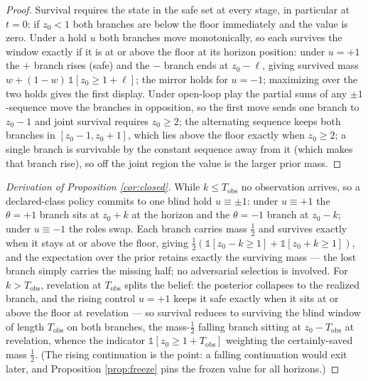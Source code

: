 \documentclass[10pt,twocolumn]{article}
\theoremstyle{plain}
\theoremstyle{definition}
\theoremstyle{remark}
\begin{document}
\begin{proof}
Survival requires the state in the safe set at every stage, in particular
at \(t = 0\): if \(z_{0} < 1\) both branches are below the floor
immediately and the value is zero. Under a hold \(u\) both branches
move monotonically, so each survives the window exactly if it is at or
above the floor at its horizon position: under \(u = +1\) the
\(+\) branch rises (safe) and the \(-\) branch ends at
\(z_{0} - \ell\), giving survived mass
\(w + (1 - w)\,\mathbb{1}[z_{0} \ge 1 + \ell]\); the mirror holds
for \(u = -1\); maximizing over the two holds gives the first display.
Under open-loop play the partial sums of any \(\pm1\)-sequence move the
branches in opposition, so the first move sends one branch to
\(z_{0} - 1\) and joint survival requires \(z_{0} \ge 2\); the
alternating sequence keeps both branches in
\([z_{0} - 1, z_{0} + 1]\), which lies above the floor exactly when
\(z_{0} \ge 2\); a single branch is survivable by the constant
sequence away from it (which makes that branch rise), so off the joint
region the value is the larger prior mass.
\end{proof}

\begin{proof}[Derivation of Proposition \ref{cor:closed}]
While \(k \le T_{\mathrm{obs}}\) no observation arrives, so a
declared-class policy commits to one blind hold \(u \equiv \pm1\): under \(u \equiv +1\) the
\(\theta = +1\) branch sits at \(z_{0} + k\) at the horizon and the
\(\theta = -1\) branch at \(z_{0} - k\); under \(u \equiv -1\) the roles
swap. Each branch carries mass \(\tfrac{1}{2}\) and survives exactly when
it stays at or above the floor, giving
\(\tfrac{1}{2}(\mathbb{1}[z_{0} - k \ge 1] + \mathbb{1}[z_{0} + k \ge 1])\),
and the expectation over the prior retains exactly the surviving
mass --- the lost branch simply carries the missing half; no adversarial
selection is involved.
For \(k > T_{\mathrm{obs}}\), revelation at \(T_{\mathrm{obs}}\) splits
the belief: the posterior collapses to the realized branch, and the
rising control \(u = +1\) keeps it safe exactly when it sits at or
above the floor at revelation --- so survival reduces to surviving the
blind window of length \(T_{\mathrm{obs}}\) on both branches, the
mass-\(\tfrac12\) falling branch sitting at \(z_{0} - T_{\mathrm{obs}}\)
at revelation, whence the indicator
\(\mathbb{1}[z_{0} \ge 1 + T_{\mathrm{obs}}]\) weighting the
certainly-saved mass \(\tfrac{1}{2}\). (The rising continuation is the
point: a falling continuation would exit later, and Proposition
\ref{prop:freeze} pins the frozen value for all horizons.)
\end{proof}
\end{document}
